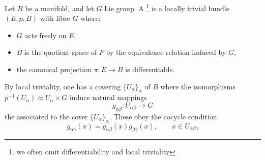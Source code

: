 
\begin{definition} Let $B$ be a manifold, and let $G$ Lie group. A \footnote{we often omit differentiability and local triviality} is a locally trivial bundle $(E,p,B)$ with fibre $G$ where:
\begin{itemize}
 \item $G$ acts freely on $E$,
\item $B$ is the quotient space of $P$ by the equivalence relation induced by $G$,
\item the canonical projection $\pi:E\rightarrow B$ is differentiable.
\end{itemize}
\end{definition}
By local triviality, one has a covering $\{U_{\alpha} \}_\alpha$ of $B$ where the isomorphisms $p^{-1}(U_\alpha)\approx U_\alpha\times G$ induce natural mappings \begin{equation}
                                               g_{\alpha\beta}:U_{\alpha\beta}\rightarrow G
                                              \end{equation}
the  associated to the cover $\{U_{\alpha} \}_\alpha$. These obey the cocycle condition
\begin{equation}\label{cycle}
  g_{\alpha\gamma}(x)=g_{\alpha\beta}(x)g_{\beta\gamma}(x),\qquad x\in U_{\alpha\beta\gamma}
\end{equation}


